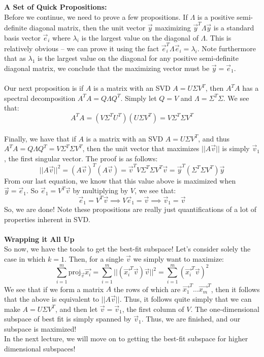 \documentclass[12pt]{amsart}
\begin{document}
\textbf{A Set of Quick Propositions:}\\
Before we continue, we need to prove a few propositions. If $\Lambda$ is a positive semi-definite diagonal matrix, then the unit vector $\vec{y}$ maximizing $\vec{y}^T \Lambda \vec{y}$ is a standard basis vector $\vec{e}_i$ where $\lambda_i$ is the largest value on the diagonal of $\Lambda$. This is relatively obvious -- we can prove it using the fact $\vec{e}_i^T \Lambda \vec{e}_i = \lambda_i$. Note furthermore that as $\lambda_1$ is the largest value on the diagonal for any positive semi-definite diagonal matrix, we conclude that the maximizing vector must be $\vec{y} = \vec{e}_1$.\\
\\
Our next proposition is if $A$ is a matrix with an SVD $A = U \Sigma V^T$, then $A^TA$ has a spectral decomposition $A^TA = Q\Lambda Q^T$. Simply let $Q=V$ and $\Lambda = \Sigma^T\Sigma$. We see that:
\[A^TA = (V \Sigma^T U^T)(U \Sigma V^T) = V\Sigma^T\Sigma V^T\]
\\
Finally, we have that if $A$ is a matrix with an SVD $A = U \Sigma V^T$, and thus $A^TA = Q\Lambda Q^T = V\Sigma^T\Sigma V^T$, then the unit vector that maximizes $||A\vec{v}||$ is simply $\vec{v}_1$, the first singular vector. The proof is as follows:
\[||A\vec{v}||^2 = (A\vec{v})^T(A\vec{v}) = \vec{v}^TV\Sigma^T\Sigma V^T\vec{v} = \vec{y}^T(\Sigma^T\Sigma V^T)\vec{y}\]
From our last equation, we know that this value above is maximized when $\vec{y} = \vec{e}_1$. So $\vec{e}_1 = V^T\vec{v}$ by multiplying by $V$, we see that:
\[\vec{e}_1 = V^T\vec{v} \implies V\vec{e}_1 = \vec{v} \implies \vec{v}_1 = \vec{v}\]
So, we are done! Note these propositions are really just quantifications of a lot of properties inherent in SVD.\\
\\
\textbf{Wrapping it All Up}\\
So now, we have the tools to get the best-fit subspace! Let's consider solely the case in which $k = 1$. Then, for a single $\vec{v}$ we simply want to maximize:
\[\sum_{i=1}^m\mathrm{proj}_{\vec{v}}{\vec{x_i}} = \sum_{i=1}^m ||(\vec{x_i}^T\vec{v})\vec{v}||^2 = 
\sum_{i=1}^m (\vec{x_i}^T\vec{v})^2\]
We see that if we form a matrix $A$ the rows of which are $\vec{x_1}^T \dots \vec{x_m}^T$, then it follows that the above is equivalent to $||A\vec{v}||$. Thus, it follows quite simply that we can make $A = U \Sigma V^T$, and then let $\vec{v} = \vec{v}_1$, the first column of ${V}$. The one-dimensional subspace of best fit is simply spanned by $\vec{v}_1$. Thus, we are finished, and our subspace is maximized!\\
In the next lecture,  we will move on to getting the best-fit subspace for higher dimensional subspaces!
\end{document}
